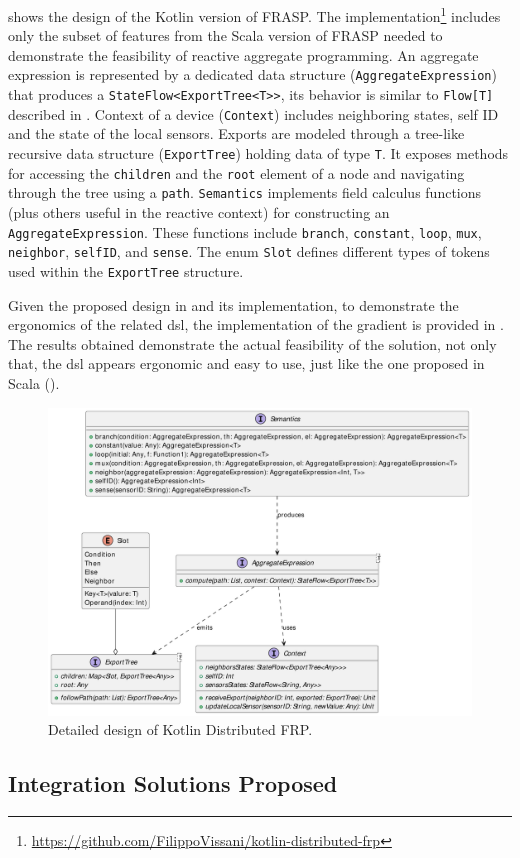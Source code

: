  shows the design of the Kotlin version of FRASP. The implementation\footnote{\url{https://github.com/FilippoVissani/kotlin-distributed-frp}} includes only the subset of features from the Scala version of FRASP needed to demonstrate the feasibility of reactive aggregate programming. An aggregate expression is represented by a dedicated data structure (\texttt{AggregateExpression}) that produces a \texttt{StateFlow<ExportTree<T>>}, its behavior is similar to \texttt{Flow[T]} described in . Context of a device (\texttt{Context}) includes neighboring states, self ID and the state of the local sensors. Exports are modeled through a tree-like recursive data structure (\texttt{ExportTree}) holding data of type \texttt{T}. It exposes methods for accessing the \texttt{children} and the \texttt{root} element of a node and navigating through the tree using a \texttt{path}. \texttt{Semantics} implements field calculus functions (plus others useful in the reactive context) for constructing an \texttt{AggregateExpression}. These functions include \texttt{branch}, \texttt{constant}, \texttt{loop}, \texttt{mux}, \texttt{neighbor}, \texttt{selfID}, and \texttt{sense}. The enum \texttt{Slot} defines different types of tokens used within the \texttt{ExportTree} structure.

Given the proposed design in  and its implementation, to demonstrate the ergonomics of the related \ac{dsl}, the implementation of the gradient is provided in . The results obtained demonstrate the actual feasibility of the solution, not only that, the \ac{dsl} appears ergonomic and easy to use, just like the one proposed in Scala ().

\begin{figure}
    \centering
    \includegraphics[width=\linewidth]{figures/kotlin-distributed-frp-design.pdf}
    \caption{Detailed design of Kotlin Distributed FRP.}
    \label{fig:kotlin-distributed-frp-design}
\end{figure}



\subsection{Integration Solutions Proposed}
